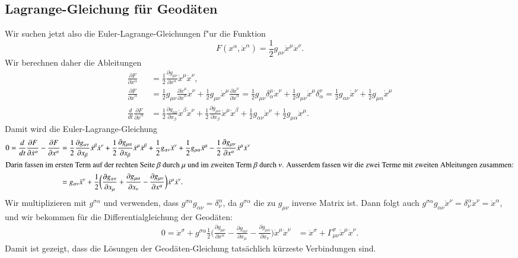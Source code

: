 \subsection{Lagrange-Gleichung für Geodäten}
Wir suchen jetzt also die Euler-Lagrange-Gleichungen f"ur die Funktion
\[
F(x^\alpha, \dot x^\alpha) = \frac12 g_{\mu\nu} \dot x^\mu \dot x^\nu.
\]
Wir berechnen daher die Ableitungen
\begin{align*}
\frac{\partial F}{\partial x^\alpha}
&=
\frac12\frac{\partial g_{\mu\nu}}{\partial x^\alpha} \dot x^\mu \dot x^\nu,
\\
\frac{\partial F}{\partial \dot x^\alpha}
&=
\frac12 g_{\mu\nu}\frac{\partial \dot x^\mu}{\partial \dot x^\alpha}\dot x^\nu
+
\frac12 g_{\mu\nu}\dot x^\mu \frac{\partial \dot x^\nu}{\partial \dot x^\alpha}
=
\frac12 g_{\mu\nu}\delta^\mu_\alpha \dot x^\nu
+
\frac12 g_{\mu\nu}\dot x^\mu \delta^\nu_\alpha 
=
\frac12 g_{\alpha\nu}\dot x^\nu
+
\frac12 g_{\mu\alpha}\dot x^\mu 
\\
\frac{d}{dt}\frac{\partial F}{\partial \dot x^\alpha}
&=
\frac12\frac{\partial g_{\alpha\nu}}{\partial x_{\beta}}\dot x^\beta\dot x^\nu
+
\frac12\frac{\partial g_{\mu\alpha}}{\partial x_{\beta}}\dot x^\mu\dot x^\beta
+
\frac12g_{\alpha\nu}\ddot x^\nu
+
\frac12g_{\mu\alpha}\ddot x^\mu.
\end{align*}
Damit wird die Euler-Lagrange-Gleichung
\begin{align*}
0=
\frac{d}{dt}\frac{\partial F}{\partial \dot x^\alpha}
-
\frac{\partial F}{\partial x^\alpha}
&=
\frac12
\frac{\partial g_{\alpha\nu}}{\partial x_{\beta}}\dot x^\beta\dot x^\nu
+
\frac12
\frac{\partial g_{\mu\alpha}}{\partial x_{\beta}}\dot x^\mu\dot x^\beta
+
\frac12
g_{\alpha\nu}\ddot x^\nu
+
\frac12
g_{\mu\alpha}\ddot x^\mu
-
\frac12\frac{\partial g_{\mu\nu}}{\partial x^\alpha} \dot x^\mu \dot x^\nu
\\
\intertext{Darin fassen im ersten Term auf der rechten Seite
$\beta$ durch $\mu$ und im zweiten Term $\beta$ durch $\nu$.
Ausserdem fassen wir die zwei Terme mit zweiten Ableitungen zusammen:}
&=
g_{\alpha\nu}\ddot x^\nu
+
\frac12
\biggl(
\frac{\partial g_{\alpha\nu}}{\partial x_\mu}
+
\frac{\partial g_{\mu\alpha}}{\partial x_\nu}
-
\frac{\partial g_{\mu\nu}}{\partial x^\alpha}
\biggr)\dot x^\mu\dot x^\nu.
\end{align*}
Wir multiplizieren mit $g^{\sigma\alpha}$ und verwenden,
dass $g^{\sigma\alpha}g_{\alpha\nu} = \delta_\nu^\alpha$, da $g^{\sigma\alpha}$
die zu $g_{\mu\nu}$ inverse Matrix ist.
Dann folgt auch
$g^{\sigma\alpha}g_{\alpha\nu}\ddot x^\nu
=
\delta_\nu^\alpha\ddot x^\nu
=
\ddot x^\alpha$, und
wir bekommen für die Differentialgleichung der Geodäten:
\begin{align*}
0=
\ddot x^\sigma
+
g^{\sigma\alpha}\frac12\biggl(
\frac{\partial g_{\mu\nu}}{\partial x^\alpha}
-
\frac{\partial g_{\alpha\nu}}{\partial x_{\mu}}
-
\frac{\partial g_{\mu\alpha}}{\partial x_{\nu}}
\biggr)
\dot x^\mu\dot x^\nu
&=
\ddot x^\sigma
+
\Gamma_{\mu\nu}^\sigma \dot x^\mu\dot x^\nu.
\end{align*}
Damit ist gezeigt, dass die Lösungen der Geodäten-Gleichung tatsächlich
kürzeste Verbindungen sind.



